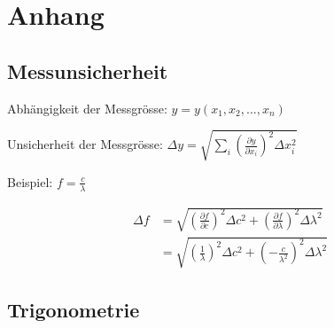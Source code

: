 \section{Anhang}


\subsection{Messunsicherheit}

Abhängigkeit der Messgrösse: $ y = y(x_1,x_2,...,x_n) $

Unsicherheit der Messgrösse: \( \Delta y = \sqrt{\sum_{i} \left( \frac{\partial y}{\partial x_i}\right)^2 \Delta x_i^2} \)

Beispiel: $ f = \frac{c}{\lambda} $

\begin{align*}
	\Delta f &= \sqrt{\left( \frac{\partial f}{\partial c}\right)^2 \Delta c^2 + \left( \frac{\partial f}{\partial \lambda}\right)^2 \Delta \lambda^2} \\
	         &= \sqrt{\left( \frac{1}{\lambda}\right)^2 \Delta c^2 + \left( - \frac{c}{\lambda^2}\right)^2 \Delta \lambda^2} 
\end{align*}



\subsection{Trigonometrie}
		

